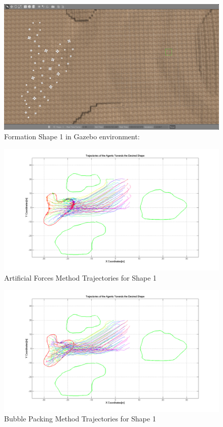 \begin{figure}[H]
\caption{Formation Shape 1 in Gazebo environment:}
\centerline{\includegraphics[scale = 0.35]{Trajectories_Formation_Shape_1_1}}
\end{figure} 	
		
\begin{figure}[H]
\caption{Artificial Forces Method Trajectories for Shape 1}
\centerline{\includegraphics[scale = 0.35]{Aritificial_Trajecories_1}}
\end{figure} 	

\begin{figure}[H]
\caption{Bubble Packing Method Trajectories for Shape 1}
\centerline{\includegraphics[scale = 0.35]{Bubble_Trajectories_1}}
\end{figure} 	
		
